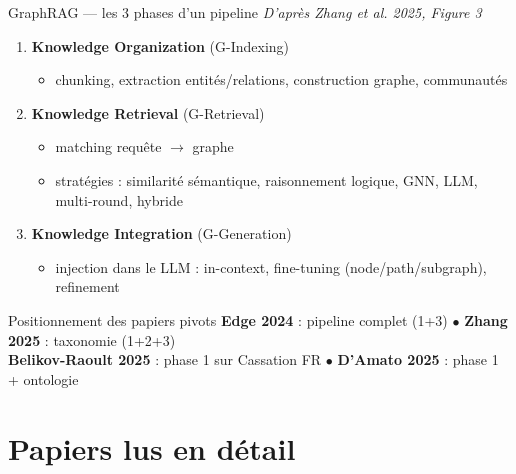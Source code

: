 \documentclass[aspectratio=169,10pt]{beamer}
\begin{document}
\begin{frame}{GraphRAG --- les 3 phases d'un pipeline}
  \textit{D'après Zhang et al. 2025, Figure 3}

  \vspace{0.5em}
  \begin{enumerate}
    \item \textbf{Knowledge Organization} (G-Indexing)
    \begin{itemize}\footnotesize
      \item chunking, extraction entités/relations, construction graphe, communautés
    \end{itemize}

    \item \textbf{Knowledge Retrieval} (G-Retrieval)
    \begin{itemize}\footnotesize
      \item matching requête $\rightarrow$ graphe
      \item stratégies : similarité sémantique, raisonnement logique, GNN, LLM, multi-round, hybride
    \end{itemize}

    \item \textbf{Knowledge Integration} (G-Generation)
    \begin{itemize}\footnotesize
      \item injection dans le LLM : in-context, fine-tuning (node/path/subgraph), refinement
    \end{itemize}
  \end{enumerate}

  \vspace{0.3em}
  \begin{exampleblock}{Positionnement des papiers pivots}
    \footnotesize
    \textbf{Edge 2024} : pipeline complet (1+3) $\bullet$ \textbf{Zhang 2025} : taxonomie (1+2+3)\\
    \textbf{Belikov-Raoult 2025} : phase 1 sur Cassation FR $\bullet$ \textbf{D'Amato 2025} : phase 1 + ontologie
  \end{exampleblock}
\end{frame}

\section{Papiers lus en détail}
\end{document}
